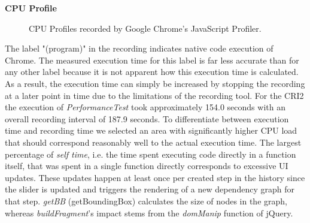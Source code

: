 	\noindent\textbf{CPU Profile}\\
	\begin{figure}[!h]
	\centering
	\hfill
	\caption{CPU Profiles recorded by Google Chrome's JavaScript Profiler.}
	\end{figure}
	The label "(program)" in the recording indicates native code execution of Chrome. The measured execution time for this label is far less accurate than for any other label because it is not apparent how this execution time is calculated. As a result, the execution time can simply be increased by stopping the recording at a later point in time due to the limitations of the recording tool.	
	For the CRI2 the execution of \emph{PerformanceTest} took approximately 154.0 seconds with an overall recording interval of 187.9 seconds. To differentiate between execution time and recording time we selected an area with significantly higher CPU load that should correspond reasonably well to the actual execution time. The largest percentage of \emph{self time}, i.e. the time spent executing code directly in a function itself, that was spent in a single function directly corresponds to excessive UI updates. These updates happen at least once per created step in the history since the slider is updated and triggers the rendering of a new dependency graph for that step. \emph{getBB} (getBoundingBox) calculates the size of nodes in the graph, whereas  \emph{buildFragment}'s impact stems from the \emph{domManip} function of jQuery.\\
